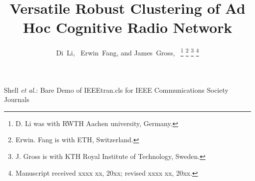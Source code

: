 \documentclass[10pt,journal,compsoc]{IEEEtran}
\theoremstyle{mytheoremstyle}
\theoremstyle{mytheoremstyle}
\theoremstyle{mytheoremstyle}
\begin{document}
%
\title{Versatile Robust Clustering of Ad Hoc Cognitive Radio Network}
%
%
%

\author{Di~Li,~
        Erwin~Fang,
        and James~Gross,~%
\thanks{D. Li was with RWTH Aachen university, Germany.}%
\thanks{Erwin. Fang is with ETH, Switzerland.}%
\thanks{J. Gross is with KTH Royal Institute of Technology, Sweden.}%
\thanks{Manuscript received xxxx xx, 20xx; revised xxxx xx, 20xx.}}

% 
%



%
{Shell \MakeLowercase{\textit{et al.}}: Bare Demo of IEEEtran.cls for IEEE Communications Society Journals}
% 
\end{document}
